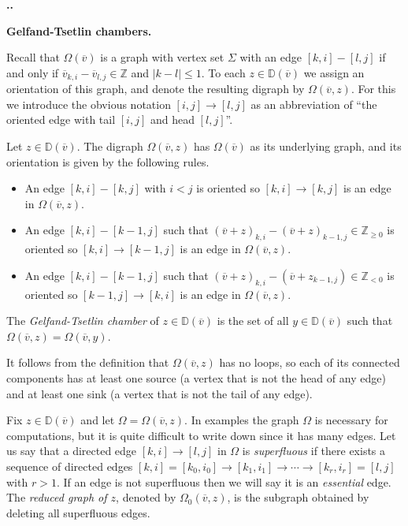 \documentclass[11pt,fleqn]{amsart}
\renewcommand\thesection{\arabic{section}}
\newcounter{para}[section]
\renewcommand\thepara{\thesection.\arabic{para}}
\def\paragraph{%
 \noindent
 \refstepcounter{para}%
 \textbf{\thepara.}\hspace{1ex}%
}
\newcommand\about[1]{%
 {\bfseries#1.}%
}
\newcommand\ZZ{\mathbb Z}
\newcommand\vv{\overline{v}}
\newcommand\DD{\mathbb D}
\begin{document}
\paragraph
\about{Gelfand-Tsetlin chambers}
\label{gt-chambers}
Recall that $\Omega(\vv)$ is a graph with vertex set $\Sigma$ with an edge
$[k,i] - [l,j]$ if and only if $\vv_{k,i} - \vv_{l,j} \in \ZZ$ and $|k-l| 
\leq 1$. To each $z \in \DD(\vv)$ we assign an orientation of this graph, and
denote the resulting digraph by $\Omega(\vv,z)$. 
For this we introduce the obvious notation $[i,j] \rightarrow [l,j]$ as an
abbreviation of ``the oriented edge with tail $[i,j]$ and head
$[l,j]$''. 

\begin{Definition}
\label{D:gt-chamber}
Let $z \in \DD(\vv)$. The digraph $\Omega(\vv,z)$ has $\Omega(\vv)$ as its 
underlying graph, and its orientation is given by the following rules.
\begin{itemize}
\item An edge $[k,i] - [k,j]$ with $i < j$ is oriented so $[k,i] \rightarrow 
[k,j]$ is an edge in $\Omega(\vv, z)$.

\item An edge $[k,i] - [k-1,j]$ such that $(\vv+z)_{k,i} - (\vv+z)_{k-1,j}
\in \ZZ_{\geq 0}$ is oriented so $[k,i] \rightarrow [k-1,j]$ is an edge in 
$\Omega(\vv, z)$.

\item An edge $[k,i] - [k-1,j]$ such that $(\vv + z)_{k,i} - (\vv + z_{k-1,j})
\in \ZZ_{<0}$ is oriented so $[k-1,j] \rightarrow [k,i]$ is an edge in 
$\Omega(\vv, z)$.
\end{itemize}
The \emph{Gelfand-Tsetlin chamber} of $z \in \DD(\vv)$ is the set of all 
$y \in \DD(\vv)$ such that $\Omega(\vv,z) = \Omega(\vv,y)$. 
\end{Definition}
It follows from the definition that $\Omega(\vv,z)$ has no loops, so each of 
its connected components has at least one source (a vertex that is not the 
head of any edge) and at least one sink (a vertex that is not the tail of any 
edge).

Fix $z \in \DD(\vv)$ and let $\Omega = \Omega(\vv,z)$. In examples the graph 
$\Omega$ is necessary for computations, but it is quite difficult to write 
down since it has many edges. Let us say that a directed edge $[k,i] 
\rightarrow [l,j]$ in $\Omega$ is \emph{superfluous} if there exists a 
sequence of directed edges $[k,i] = [k_0, i_0] \rightarrow [k_1, i_1] 
\rightarrow \cdots \rightarrow [k_r, i_r] = [l,j]$ with $r > 1$. If an edge is 
not superfluous then we will say it is an \emph{essential} edge. The 
\emph{reduced graph of $z$}, denoted by $\Omega_0(\vv,z)$, is the subgraph 
obtained by deleting all superfluous edges. 
\end{document}
